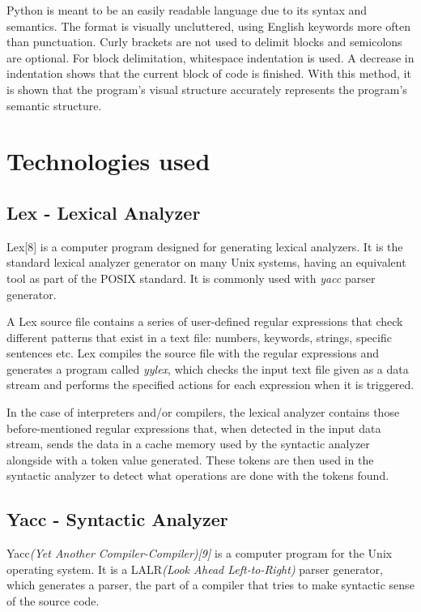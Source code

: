 \documentclass[12pt,a4paper,twoside]{report}
\begin{document}
Python is meant to be an easily readable language due to its syntax and semantics. The format is visually uncluttered, using English keywords more often than punctuation. Curly brackets are not used to delimit blocks and semicolons are optional. For block delimitation, whitespace indentation is used. A decrease in indentation shows that the current block of code is finished. With this method, it is shown that the program's visual structure accurately represents the program's semantic structure. 

\section{Technologies used}

\subsection{Lex - Lexical Analyzer}

Lex[8] is a computer program designed for generating lexical analyzers. It is the standard lexical analyzer generator on many Unix systems, having an equivalent tool as part of the POSIX standard. It is commonly used with \textit{yacc} parser generator. 

A Lex source file contains a series of user-defined regular expressions that check different patterns that exist in a text file: numbers, keywords, strings, specific sentences etc. Lex compiles the source file with the regular expressions and generates a program called \textit{yylex}, which checks the input text file given as a data stream and performs the specified actions for each expression when it is triggered. 

In the case of interpreters and/or compilers, the lexical analyzer contains those before-mentioned regular expressions that, when detected in the input data stream, sends the data in a cache memory used by the syntactic analyzer alongside with a token value generated. These tokens are then used in the syntactic analyzer to detect what operations are done with the tokens found.
\subsection{Yacc - Syntactic Analyzer}

Yacc\textit{(Yet Another Compiler-Compiler)[9]} is a computer program for the Unix operating system. It is a LALR\textit{(Look Ahead Left-to-Right)} parser generator, which generates a parser, the part of a compiler that tries to make syntactic sense of the source code.
\end{document}
